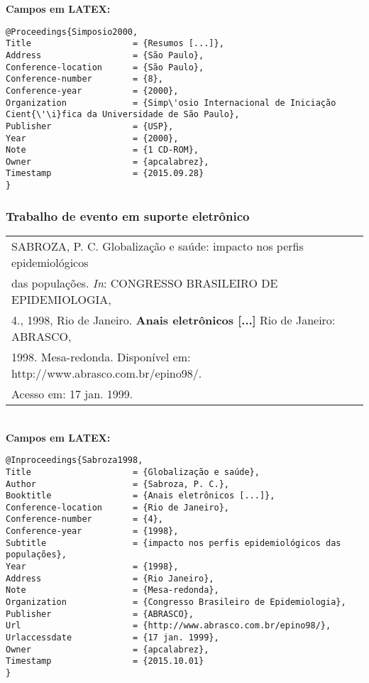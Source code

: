 \textbf{Campos em LATEX:} 

\begin{verbatim}
@Proceedings{Simposio2000,
Title                    = {Resumos [...]},
Address                  = {São Paulo},
Conference-location      = {São Paulo},
Conference-number        = {8},
Conference-year          = {2000},
Organization             = {Simp\'osio Internacional de Iniciação 
Cient{\'\i}fica da Universidade de São Paulo},
Publisher                = {USP},
Year                     = {2000},
Note                     = {1 CD-ROM},
Owner                    = {apcalabrez},
Timestamp                = {2015.09.28}
}
\end{verbatim}

\subsubsection{Trabalho de evento em suporte eletrônico}

\begin{tabular}{|l|c|} \hline
	SABROZA, P. C. Globalização e saúde: impacto nos perfis
	epidemiológicos \\das populações. \textit{In}: CONGRESSO BRASILEIRO DE
	EPIDEMIOLOGIA,\\4., 1998, Rio de Janeiro. \textbf{Anais eletrônicos [...]} Rio de
	Janeiro: ABRASCO,\\1998. Mesa-redonda. Disponível em:
	http://www.abrasco.com.br/epino98/.\\ Acesso em: 17 jan. 1999.\\\hline 
\end{tabular} \\

\textbf{Campos em LATEX:} 

\begin{verbatim}
@Inproceedings{Sabroza1998,
Title                    = {Globalização e saúde},
Author                   = {Sabroza, P. C.},
Booktitle                = {Anais eletrônicos [...]},
Conference-location      = {Rio de Janeiro},
Conference-number        = {4},
Conference-year          = {1998},
Subtitle                 = {impacto nos perfis epidemiológicos das 
populações},
Year                     = {1998},
Address                  = {Rio Janeiro},
Note                     = {Mesa-redonda},
Organization             = {Congresso Brasileiro de Epidemiologia},
Publisher                = {ABRASCO},
Url                      = {http://www.abrasco.com.br/epino98/},
Urlaccessdate            = {17 jan. 1999},
Owner                    = {apcalabrez},
Timestamp                = {2015.10.01}
}
\end{verbatim}

